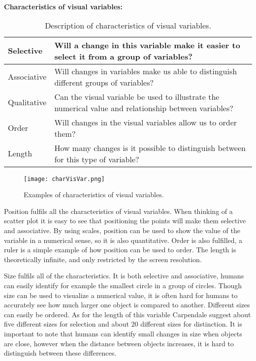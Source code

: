 \textbf{Characteristics of visual variables:}
\begin{table}[h!]
  \begin{tabular}{|l|p{10cm}|}
      \hline
      Selective   & Will a change in this variable make it easier to select it from a group of variables? \\ \hline
        Associative & Will changes in variables make us able to distinguish different groups of variables? \\ \hline 
        Qualitative & Can the visual variable be used to illustrate the numerical value and relationship between variables? \\ \hline
        Order       & Will changes in the visual variables allow us to order them? \\ \hline
        Length      & How many changes is it possible to distinguish between for this type of variable? \\ \hline
    \end{tabular}
    \caption{Description of characteristics of visual variables.}
\end{table}

\begin{figure}[h!]
	\centering
		\texttt{[image: charVisVar.png]}
		\caption{\footnotesize Examples of characteristics of visual variables.}
		\label{fig:charVisVar}
\end{figure}

Position fulfils all the characteristics of visual variables. When thinking of a scatter plot it is easy to see that positioning the points will make them selective and associative. By using scales, position can be used to show the value of the variable in a numerical sense, so it is also quantitative. Order is also fulfilled, a ruler is a simple example of how position can be used to order. The length is theoretically infinite, and only restricted by the screen resolution.

Size fulfils all of the characteristics. It is both selective and associative, humans can easily identify for example the smallest circle in a group of circles. Though size can be used to visualize a numerical value, it is often hard for humans to accurately see how much larger one object is compared to another. Different sizes can easily be ordered. As for the length of this variable Carpendale suggest about five different sizes for selection and about 20 different sizes for distinction. It is important to note that humans can identify small changes in size when objects are close, however when the distance between objects increases, it is hard to distinguish between these differences.

